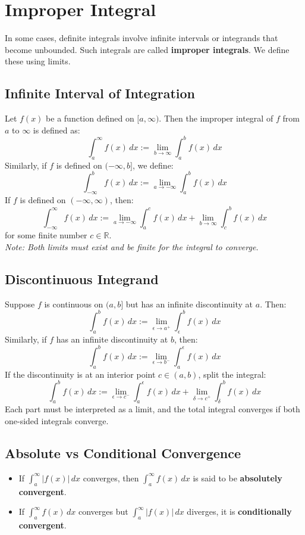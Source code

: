 \documentclass[11pt]{article}
\begin{document}
\section{Improper Integral}
In some cases, definite integrals involve infinite intervals or integrands that become unbounded. Such integrals are called \textbf{improper integrals}. We define these using limits.
\subsection{Infinite Interval of Integration}
Let $f(x)$ be a function defined on $[a, \infty)$. Then the improper integral of $f$ from $a$ to $\infty$ is defined as:
\[
    \int_a^{\infty} f(x)\,dx := \lim_{b \to \infty} \int_a^b f(x)\,dx
\]
Similarly, if $f$ is defined on $(-\infty, b]$, we define:
\[
    \int_{-\infty}^{b} f(x)\,dx := \lim_{a \to -\infty} \int_a^b f(x)\,dx
\]
If $f$ is defined on $(-\infty, \infty)$, then:
\[
    \int_{-\infty}^{\infty} f(x)\,dx := \lim_{a \to -\infty} \int_a^c f(x)\,dx + \lim_{b \to \infty} \int_c^b f(x)\,dx
\]
for some finite number $c \in \mathbb{R}$.\\[.5em]
\textit{Note: Both limits must exist and be finite for the integral to converge.}
\subsection{Discontinuous Integrand}
Suppose $f$ is continuous on $(a, b]$ but has an infinite discontinuity at $a$. Then:
\[
    \int_a^b f(x)\,dx := \lim_{\epsilon \to a^+} \int_{\epsilon}^b f(x)\,dx
\]
Similarly, if $f$ has an infinite discontinuity at $b$, then:
\[
    \int_a^b f(x)\,dx := \lim_{\epsilon \to b^-} \int_a^{\epsilon} f(x)\,dx
\]
If the discontinuity is at an interior point $c \in (a,b)$, split the integral:
\[
    \int_a^b f(x)\,dx := \lim_{\epsilon \to c^-} \int_a^{\epsilon} f(x)\,dx + \lim_{\delta \to c^+} \int_{\delta}^b f(x)\,dx
\]
Each part must be interpreted as a limit, and the total integral converges if both one-sided integrals converge.
\subsection{Absolute vs Conditional Convergence}
\begin{itemize}
    \item If $\displaystyle\int_a^{\infty} |f(x)|\,dx$ converges, then $\displaystyle\int_a^{\infty} f(x)\,dx$ is said to be \textbf{absolutely convergent}.
    \item If $\displaystyle\int_a^{\infty} f(x)\,dx$ converges but $\displaystyle\int_a^{\infty} |f(x)|\,dx$ diverges, it is \textbf{conditionally convergent}.
\end{itemize}
\end{document}
